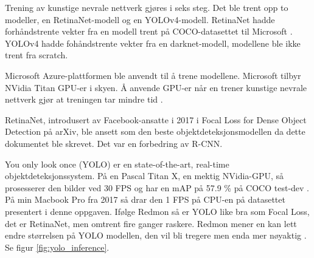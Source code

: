 


Trening av kunstige nevrale nettverk gjøres i seks steg. Det ble trent opp to modeller, en RetinaNet-modell og en YOLOv4-modell. RetinaNet hadde forhåndstrente vekter fra en modell trent på COCO-datasettet til Microsoft \cite{Lin m.fl. 2015 s. 1}. YOLOv4 hadde fohåndstrente vekter fra en darknet-modell, modellene ble ikke trent fra scratch. %

Microsoft Azure-plattformen ble anvendt til å trene modellene. Microsoft tilbyr NVidia Titan GPU-er i skyen. Å anvende GPU-er når en trener kunstige nevrale nettverk gjør at treningen tar mindre tid \cite{Dean m.fl. 2012 s. 1}.

RetinaNet, introdusert av Facebook-ansatte i 2017 i Focal Loss for Dense Object Detection på arXiv, ble ansett som den beste objektdeteksjonsmodellen da dette dokumentet ble skrevet. Det var en forbedring av R-CNN. \cite{Lin m.fl. 2017}

You only look once (YOLO) er en state-of-the-art, real-time objektdeteksjonssystem. På en Pascal Titan X, en mektig NVidia-GPU, så prosesserer den bilder ved 30 FPS og har en mAP på 57.9 \% på COCO test-dev \cite{Redmon 2018}. På min Macbook Pro fra 2017 så drar den 1 FPS på CPU-en på datasettet presentert i denne oppgaven. Ifølge Redmon så er YOLO like bra som Focal Loss, det er RetinaNet, men omtrent fire ganger raskere. Redmon mener en kan lett endre størrelsen på YOLO modellen, den vil bli tregere men enda mer nøyaktig \cite{Redmon 2016}. Se figur \ref{fig:yolo_inference}. %

